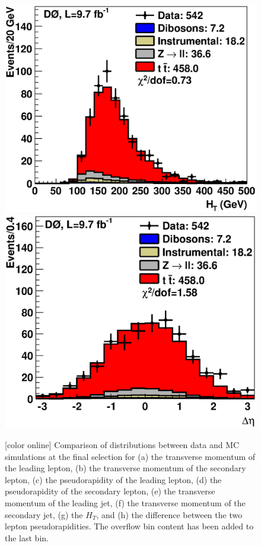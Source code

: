 \documentclass[aps,prd,twocolumn,showpacs,superscriptaddress,groupedaddress,floatfix]{revtex4}
\begin{document}
\begin{figure}[!ht]
\includegraphics[width=\the\unitlength]{h_1.eps}
\includegraphics[width=\the\unitlength]{h_15.eps}

 \caption{ [color online] Comparison of distributions between data  and MC simulations at the final selection for
(a) the transverse momentum of the leading lepton,
(b) the transverse momentum of the secondary lepton,
(c) the pseudorapidity of the leading lepton,
(d) the pseudorapidity of the secondary  lepton,
(e) the transverse momentum of the leading jet,
(f) the transverse momentum of the secondary jet,
(g) the $H_T$, and
(h) the difference between the two lepton pseudorapidities.
The overflow bin content has been added to the last bin.
\label{fig:selection_comb}}
\vspace{1cm}  \end{figure} 
\end{document}
